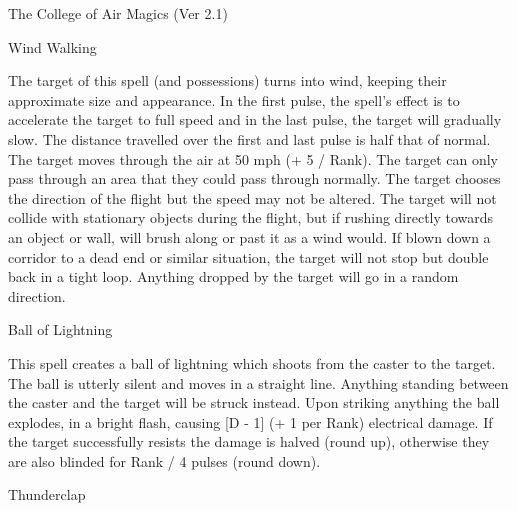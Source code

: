 \begin{Chapter}{The College of Air Magics (Ver 2.1)}
\begin{spell}[S-17]{Wind Walking}
\begin{effects}
The target of this spell (and possessions) turns into wind, keeping
their approximate size and appearance. In the first pulse, the spell’s
effect is to accelerate the target to full speed and in the last
pulse, the target will gradually slow.  The distance travelled over
the first and last pulse is half that of normal. The target moves
through the air at 50 mph (+ 5 / Rank).  The target can only pass
through an area that they could pass through normally.  The target
chooses the direction of the flight but the speed may not be altered.
The target will not collide with stationary objects during the flight,
but if rushing directly towards an object or wall, will brush along or
past it as a wind would.  If blown down a corridor to a dead end or
similar situation, the target will not stop but double back in a tight
loop.  Anything dropped by the target will go in a random direction.
\end{effects}
\end{spell}

\begin{spell}[S-18]{Ball of Lightning}

\begin{effects}
This spell creates a ball of lightning which shoots from the caster to
the target.  The ball is utterly silent and moves in a straight
line. Anything standing between the caster and the target will be
struck instead.  Upon striking anything the ball explodes, in a bright
flash, causing [D - 1] (+ 1 per Rank) electrical damage.  If the
target successfully resists the damage is halved (round up), otherwise
they are also blinded for Rank / 4 pulses (round down).
\end{effects}
\end{spell}

\begin{spell}[S-19]{Thunderclap}


\end{spell}
\end{Chapter}
